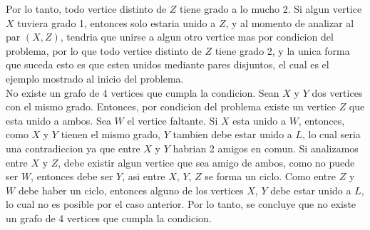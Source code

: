 \documentclass[12pt]{article}
\begin{document}
Por lo tanto, todo vertice distinto de $Z$ tiene grado a lo mucho 2. Si algun vertice $X$ tuviera grado 1, entonces solo estaria unido a $Z$, y al momento de analizar al par $(X,Z)$, tendria que unirse a algun otro vertice mas por condicion del problema, por lo que todo vertice distinto de $Z$ tiene grado 2, y la unica forma que suceda esto es que esten unidos mediante pares disjuntos, el cual es el ejemplo mostrado al inicio del problema.
\\
No existe un grafo de 4 vertices que cumpla la condicion. Sean $X$ y $Y$ dos vertices con el mismo grado. Entonces, por condicion del problema existe un vertice $Z$ que esta unido a ambos.
Sea $W$ el vertice faltante. Si $X$ esta unido a $W$, entonces, como $X$ y $Y$ tienen el mismo grado, $Y$ tambien debe estar unido a $L$, lo cual seria una contradiccion ya que entre $X$ y $Y$ habrian 2 amigos en comun. Si analizamos entre $X$ y $Z$, debe existir algun vertice que sea amigo de ambos, como no puede ser $W$, entonces debe ser $Y$, asi entre $X$, $Y$, $Z$ se forma un ciclo. Como entre $Z$ y $W$ debe haber un ciclo, entonces alguno de los vertices $X$, $Y$ debe estar unido a $L$, lo cual no es posible por el caso anterior. Por lo tanto, se concluye que no existe un grafo de 4 vertices que cumpla la condicion.
\end{document}
